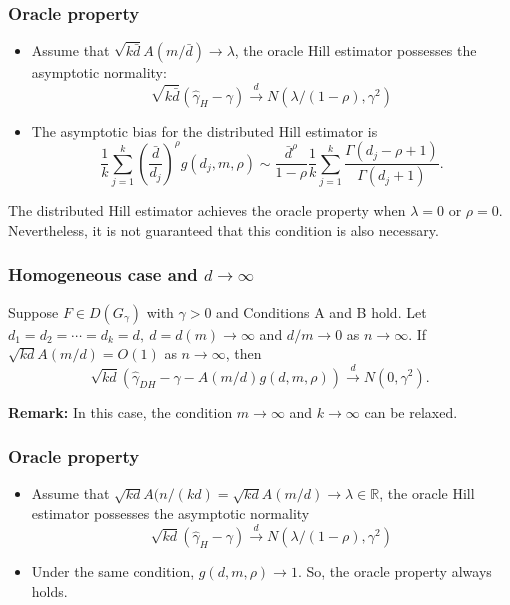 \documentclass{beamer}
\begin{document}
\begin{frame}
    \frametitle{Oracle property}
\begin{itemize}
    \item Assume that $\sqrt{k\bar{d}}A(m/\bar{d})\to\lambda$, the oracle Hill estimator possesses the asymptotic normality:
    $$
    \sqrt{k\bar{d}}(\hat{\gamma}_H-\gamma) \stackrel{d}{\to} N(\lambda/(1-\rho),\gamma^2)
    $$
    \item The asymptotic bias for the distributed Hill estimator is 
    $$
    \dfrac{1}{k}\sum_{j=1}^k \left(\dfrac{\bar{d}}{d_j}\right)^{\rho} g(d_j,m,\rho)  \sim \dfrac{\bar{d}^{\rho}}{1-\rho} \dfrac{1}{k} \sum_{j=1}^k \dfrac{\Gamma(d_j-\rho+1)}{\Gamma(d_j+1)}.
    $$
\end{itemize}
    
The distributed Hill estimator achieves the oracle property when $\lambda=0$ or $\rho=0$. Nevertheless, it is not guaranteed that this condition is also necessary.

\end{frame}
\begin{frame}
    \frametitle{Homogeneous case and  $d\to \infty$ }

    \begin{theorem}
        Suppose $F\in D(G_{\gamma})$
         with $\gamma>0$ and Conditions A and   B hold.  Let $d_1=d_2=\cdots=d_k=d, \ d=d(m)\to \infty$ and $ d/m \to 0$ as $n \to \infty$. If $\sqrt{kd}A(m/d)=O(1)$ as $n \to \infty$, then 
         $$
           \sqrt{kd}\left( \hat{\gamma}_{DH}-\gamma -A(m/d)g(d,m,\rho)\right)  \stackrel{d}{\to} N(0,\gamma^2).
           $$
        \end{theorem}
\bigskip


{\bf Remark: }In this case, the condition $m\to \infty$ and $k\to \infty$ can be relaxed.

\end{frame}

\begin{frame}
    \frametitle{Oracle property}
\begin{itemize}
    \item   Assume that $\sqrt{kd}A(n/(kd)=\sqrt{kd}A(m/d)\to \lambda\in \mathbb{R}$, the oracle Hill estimator possesses the asymptotic normality $$\sqrt{kd}(\hat{\gamma}_H-\gamma) \stackrel{d}{\to} N(\lambda/(1-\rho),\gamma^2)$$
    \item Under the same condition, $g(d,m,\rho)\to 1$. So, the oracle property always holds.
\end{itemize}
    

\end{frame}
\end{document}
